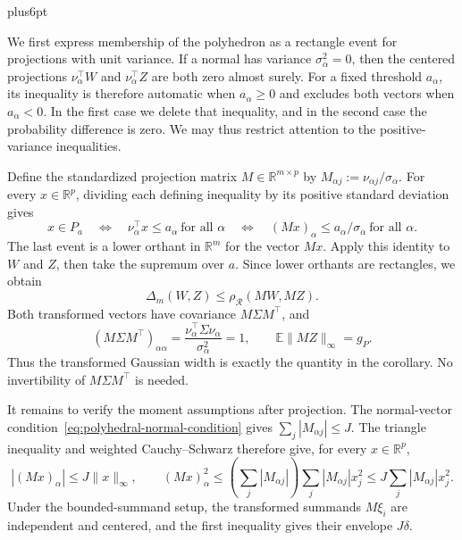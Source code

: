 \documentclass[11pt,letterpaper,twoside,leqno]{article}
\makeatletter
\theoremstyle{bookplain}
\theoremstyle{bookremark}
\renewenvironment{proof}[1][\proofname]{\par
  \pushQED{\qed}\normalfont\topsep6pt plus6pt\relax
  \trivlist\item[\hskip\labelsep\bfseries #1\@addpunct{.}]\ignorespaces
}{\popQED\endtrivlist\@endpefalse}
\newcommand{\E}{\mathbb E}
\newcommand{\R}{\mathbb R}
\newcommand{\rh}{\rho_{\mathcal R}}
\makeatother
\begin{document}
\begin{proof}[Proof of Corollary~\ref{cor:polyhedral-transfer}]
We first express membership of the polyhedron as a rectangle event
for projections with unit variance. If a normal has variance
$\sigma_\alpha^2=0$, then the centered projections
$\nu_\alpha^\top W$ and $\nu_\alpha^\top Z$ are both zero almost surely.
For a fixed threshold $a_\alpha$, its inequality is therefore automatic
when $a_\alpha\ge0$ and excludes both vectors when $a_\alpha<0$.
In the first case we delete that inequality, and in the second case
the probability difference is zero. We may thus restrict attention
to the positive-variance inequalities.

Define the standardized projection matrix $M\in\R^{m\times p}$ by
$M_{\alpha j}:=\nu_{\alpha j}/\sigma_\alpha$.
For every $x\in\R^p$, dividing each defining inequality by its
positive standard deviation gives
\[
 x\in P_a
 \quad\Longleftrightarrow\quad
 \nu_\alpha^\top x\le a_\alpha\ \text{for all }\alpha
 \quad\Longleftrightarrow\quad
 (Mx)_\alpha\le a_\alpha/\sigma_\alpha\ \text{for all }\alpha.
\]
The last event is a lower orthant in $\R^m$ for the vector $Mx$.
Apply this identity to $W$ and $Z$, then take the supremum over $a$.
Since lower orthants are rectangles, we obtain
\begin{equation}
 \Delta_m(W,Z)\le\rh(MW,MZ).
 \label{eq:polyhedral-transfer}
\end{equation}
Both transformed vectors have covariance $M\Sigma M^\top$, and
\[
 (M\Sigma M^\top)_{\alpha\alpha}
 =\frac{\nu_\alpha^\top\Sigma\nu_\alpha}{\sigma_\alpha^2}=1,
 \qquad \E\|MZ\|_\infty=g_P.
\]
Thus the transformed Gaussian width is exactly the quantity in the
corollary. No invertibility of $M\Sigma M^\top$ is needed.

It remains to verify the moment assumptions after projection.
The normal-vector condition~\eqref{eq:polyhedral-normal-condition}
gives $\sum_j|M_{\alpha j}|\le J$.
The triangle inequality and weighted Cauchy--Schwarz therefore give,
for every $x\in\R^p$,
\[
 |(Mx)_\alpha|\le J\|x\|_\infty,
 \qquad
 (Mx)_\alpha^2
 \le\left(\sum_j|M_{\alpha j}|\right)
           \sum_j|M_{\alpha j}|x_j^2
 \le J\sum_j|M_{\alpha j}|x_j^2.
\]
Under the bounded-summand setup, the transformed summands $M\xi_i$
are independent and centered, and the first inequality gives their
envelope $J\delta$.


\end{proof}
\end{document}
